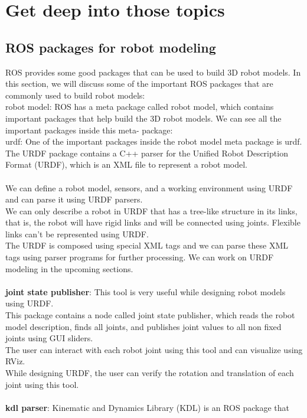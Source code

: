 \documentclass[a4paper]{article}
\begin{document}
\section{Get deep into those topics}

\subsection{ROS packages for robot modeling}
ROS provides some good packages that can be used to build 3D robot models. In this
section, we will discuss some of the important ROS packages that are commonly used to
build robot models:
\\robot model: ROS has a meta package called robot model, which contains important 
packages that 
help build the 3D robot models. We can see all the important packages inside this meta-
package:
\\urdf: One of the important packages inside the robot model meta package is urdf. The 
URDF package contains a C++ parser for the Unified Robot Description Format (URDF),
which is an XML file to represent a robot model.
\\\\ We can define a robot model, sensors, and a working environment using URDF and 
can parse it using URDF parsers.
\\We can only describe a robot in URDF that has a tree-like 
structure in its links, that is, the robot will have rigid links and will be connected 
using joints. Flexible links can't be represented using URDF.
\\ The URDF is composed using special XML tags and we can parse these XML tags using 
parser programs for further processing. We can work on URDF modeling in the upcoming 
sections.
\\\\\textbf{joint state publisher}: This tool is very useful while designing robot 
models using URDF.
\\This package contains a node called joint state publisher, which reads the robot 
model description, finds all joints, and publishes joint values to all non fixed 
joints 
using GUI sliders. 
\\The user can interact with each robot joint using this tool and can visualize using 
RViz.
\\While designing URDF, the user can verify the rotation and translation of each 
joint using this tool. 
\\\\\textbf{kdl parser}: Kinematic and Dynamics Library (KDL) is an ROS package that 
\end{document}
